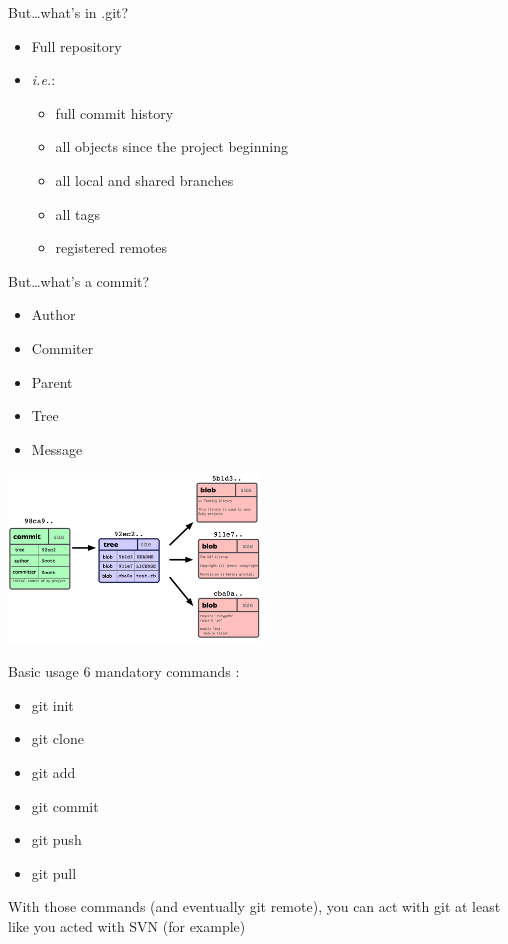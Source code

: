 \documentclass{beamer}
\begin{document}
\begin{frame}{But\dots what's in .git?}
\begin{itemize}
   \item Full repository\pause
   \item \emph{i.e.}:
      \begin{itemize}
         \item full commit history
         \item all objects since the project beginning
         \item all local and shared branches
         \item all tags
         \item registered remotes
      \end{itemize}
\end{itemize}
\end{frame}

\begin{frame}{But\dots what's a commit?}
   \begin{itemize}
      \item Author 
      \item Commiter 
      \item Parent 
      \item Tree 
      \item Message 
   \end{itemize}
 
   \begin{center}
      \includegraphics[width=0.5\textwidth]{commit-object.png}
   \end{center}
\end{frame}

\begin{frame}{Basic usage}
    6 mandatory commands : \\
    \begin{itemize}
        \item git init
        \item git clone
        \item git add
        \item git commit
        \item git push
        \item git pull
    \end{itemize}
    With those commands (and eventually git remote), you can act with git at least like you acted with SVN (for example)
\end{frame}
\end{document}
